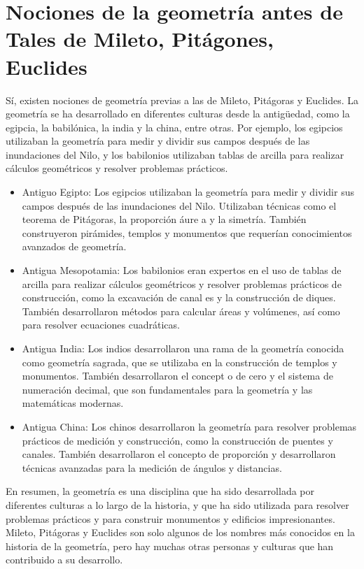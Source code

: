 \documentclass[10pt]{article}
\begin{document}
\section{Nociones de la geometría antes de Tales de Mileto, Pitágones, Euclides}
Sí, existen nociones de geometría previas a las de Mileto, Pitágoras y Euclides. La geometría se ha desarrollado en diferentes culturas desde la antigüedad, como la egipcia, la babilónica, la india y la china, entre otras. Por ejemplo, los egipcios utilizaban la geometría para medir y dividir sus campos después de las inundaciones del Nilo, y los babilonios utilizaban tablas de arcilla para realizar cálculos geométricos y resolver problemas prácticos.

\begin{itemize}
\item{Antiguo Egipto}: Los egipcios utilizaban la geometría para medir y dividir sus campos después de las inundaciones del Nilo. Utilizaban técnicas como el teorema de Pitágoras, la proporción áure
a y la simetría. También construyeron pirámides, templos y monumentos que requerían conocimientos avanzados de geometría.

\item{Antigua Mesopotamia}: Los babilonios eran expertos en el uso de tablas de arcilla para realizar cálculos geométricos y resolver problemas prácticos de construcción, como la excavación de canal
es y la construcción de diques. También desarrollaron métodos para calcular áreas y volúmenes, así como para resolver ecuaciones cuadráticas.

\item{Antigua India}: Los indios desarrollaron una rama de la geometría conocida como geometría sagrada, que se utilizaba en la construcción de templos y monumentos. También desarrollaron el concept
o de cero y el sistema de numeración decimal, que son fundamentales para la geometría y las matemáticas modernas.

\item{Antigua China}: Los chinos desarrollaron la geometría para resolver problemas prácticos de medición y construcción, como la construcción de puentes y canales. También desarrollaron el concepto
 de proporción y desarrollaron técnicas avanzadas para la medición de ángulos y distancias.
\end{itemize}

En resumen, la geometría es una disciplina que ha sido desarrollada por diferentes culturas a lo largo de la historia, y que ha sido utilizada para resolver problemas prácticos y para construir
 monumentos y edificios impresionantes. Mileto, Pitágoras y Euclides son solo algunos de los nombres más conocidos en la historia de la geometría, pero hay muchas otras personas y culturas que
han contribuido a su desarrollo.
\end{document}
